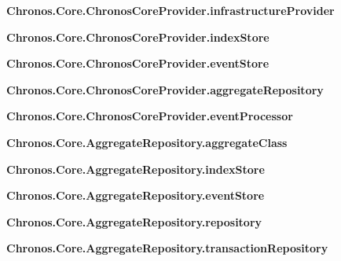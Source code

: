 \begin{DoxyCompactItemize}
\item 
{\bfseries Chronos.\+Core.\+Chronos\+Core\+Provider.\+infrastructure\+Provider}\hypertarget{group__Chronos_ga672179258a1905dbfc78f64db2dab86c}{}\label{group__Chronos_ga672179258a1905dbfc78f64db2dab86c}

\item 
{\bfseries Chronos.\+Core.\+Chronos\+Core\+Provider.\+index\+Store}\hypertarget{group__Chronos_ga22f55f880b99d8eb441e455b1ff8ac85}{}\label{group__Chronos_ga22f55f880b99d8eb441e455b1ff8ac85}

\item 
{\bfseries Chronos.\+Core.\+Chronos\+Core\+Provider.\+event\+Store}\hypertarget{group__Chronos_gae61cd9b0f3cfff8322385ce2d0067871}{}\label{group__Chronos_gae61cd9b0f3cfff8322385ce2d0067871}

\item 
{\bfseries Chronos.\+Core.\+Chronos\+Core\+Provider.\+aggregate\+Repository}\hypertarget{group__Chronos_gaa14c91e80faf5384c034eebefd888026}{}\label{group__Chronos_gaa14c91e80faf5384c034eebefd888026}

\item 
{\bfseries Chronos.\+Core.\+Chronos\+Core\+Provider.\+event\+Processor}\hypertarget{group__Chronos_ga57a34bf3c27478c9cc296075a2633122}{}\label{group__Chronos_ga57a34bf3c27478c9cc296075a2633122}

\item 
{\bfseries Chronos.\+Core.\+Aggregate\+Repository.\+aggregate\+Class}\hypertarget{group__Chronos_gaf3f4a9294d8b828fcdc4cc072644e5d7}{}\label{group__Chronos_gaf3f4a9294d8b828fcdc4cc072644e5d7}

\item 
{\bfseries Chronos.\+Core.\+Aggregate\+Repository.\+index\+Store}\hypertarget{group__Chronos_ga95c3aa5f102a1b94719dc0174349f65a}{}\label{group__Chronos_ga95c3aa5f102a1b94719dc0174349f65a}

\item 
{\bfseries Chronos.\+Core.\+Aggregate\+Repository.\+event\+Store}\hypertarget{group__Chronos_ga2d0096bb6dd7053fcdf801f479cc4191}{}\label{group__Chronos_ga2d0096bb6dd7053fcdf801f479cc4191}

\item 
{\bfseries Chronos.\+Core.\+Aggregate\+Repository.\+repository}\hypertarget{group__Chronos_ga4e1bd3db9c6ac9a2618dad015a5e6099}{}\label{group__Chronos_ga4e1bd3db9c6ac9a2618dad015a5e6099}

\item 
{\bfseries Chronos.\+Core.\+Aggregate\+Repository.\+transaction\+Repository}\hypertarget{group__Chronos_ga884e92dbd523a3b9901b50b6728c8340}{}\label{group__Chronos_ga884e92dbd523a3b9901b50b6728c8340}


\end{DoxyCompactItemize}
